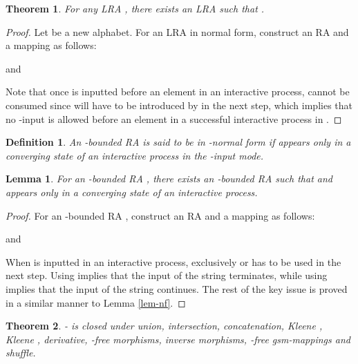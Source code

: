\documentclass[preprint,fleqn,1p]{elsarticle}
\newtheorem{thm}{Theorem}
\newtheorem{lem}{Lemma}
\newtheorem{de}{Definition}
\begin{document}
\begin{thm}
For any LRA , there exists an LRA  such that .
\end{thm}

\begin{proof}
Let  be a new alphabet.
For an LRA  in normal form, construct an RA  and a mapping  as follows:

and

Note that once  is inputted before an element  in an interactive process,  cannot be consumed since  will have to be introduced by  in the next step, which implies that no -input is  allowed before an element  in a successful interactive process in .
\end{proof}

\begin{de} \rm{
An -bounded RA  is said to be in} \it{-normal form} \rm{if  appears  only in a converging state of an interactive process in the -input mode.}
\end{de}

\begin{lem}
For an -bounded RA , there exists an -bounded RA  such that  and  appears  only in a converging state of an interactive process.
\end{lem}

\begin{proof}
For an -bounded RA , construct an RA  and a mapping  as follows:

and

When  is inputted in an interactive process,  exclusively or  has to be used in the next step. Using  implies that the input of the string terminates, while using  implies that the input of the string continues.
The rest of the key issue is proved in a similar manner to Lemma \ref{lem-nf}.
\end{proof}



\begin{thm}
- is closed under union, intersection, concatenation, Kleene , Kleene , derivative, -free morphisms, inverse morphisms, -free gsm-mappings and shuffle.
\end{thm}
\end{document}
